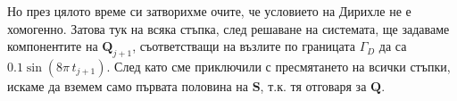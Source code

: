 \documentclass[bulgarian, 12pt]{article}
\begin{document}
\begin{large}
Но през цялото време си затворихме очите, че условието на Дирихле не е хомогенно.
Затова тук на всяка стъпка, след решаване на системата, ще задаваме компонентите на $\mathbf{Q}_{j + 1}$, съответстващи на възлите по границата $\Gamma_{D}$ да са $0.1\sin(8\pi\, t_{j+1})$. 
След като сме приключили с пресмятането на всички стъпки, искаме да вземем само първата половина на $\mathbf{S}$, т.к. тя отговаря за $\mathbf{Q}$.
\begin{comment}
    \begin{cases}
      \mathbf{Q}_{j + 1} - \mathbf{Q}_j = \frac{\tau}{2} \left( \mathbf{P}_{j + 1} + \mathbf{P}_j \right) \\
      \mathbf{P}_{j + 1} - \mathbf{P}_j = -\frac{\tau}{2} (M^0)^{-1} M^1 \left( \mathbf{Q}_{j + 1} + \mathbf{Q}_j \right) \\
      \mathbf{Q}_0 = \mathbf{P}_0 = 0 \\
    \end{cases}
\end{comment}
\begin{comment}
\begin{align*}
	&\begin{cases}
		\mathbf{S}_{j+1} - \mathbf{S}_{j} = 
		\frac{\tau}{2} A \left(\mathbf{S}_{j+1} + \mathbf{S}_{j}\right)  \\
		\mathbf{S}_{0} = 0 \\
	\end{cases} \iff
	\begin{cases}
		(I - \frac{\tau}{2} A)\mathbf{S}_{j+1} = (I + \frac{\tau}{2} A) \mathbf{S}_{j} \\
		\mathbf{S}_{0} = 0 \\
	\end{cases} \\
	& \text{Т.е. получаваме, че} \quad
	\begin{cases}
		\mathbf{S}_{j+1} = (I - \frac{\tau}{2} A)^{-1} (I + \frac{\tau}{2} A) \mathbf{S}_{j} \\
		\mathbf{S}_{0} = 0 \\
	\end{cases}
\end{align*}
\end{comment}
\begin{comment}
За да се освободим от неявните пресмятания, може да направим следното:
\begin{align*}
&\mathbf{Q}_{j + 1} = \mathbf{Q}_j + \frac{\tau}{2} \left( 2\mathbf{P}_j -\frac{\tau}{2} (M^0)^{-1} M^1 \left( \mathbf{Q}_{j + 1} + \mathbf{Q}_j \right) \right) \\

\end{comment}
\end{large}
\end{document}
